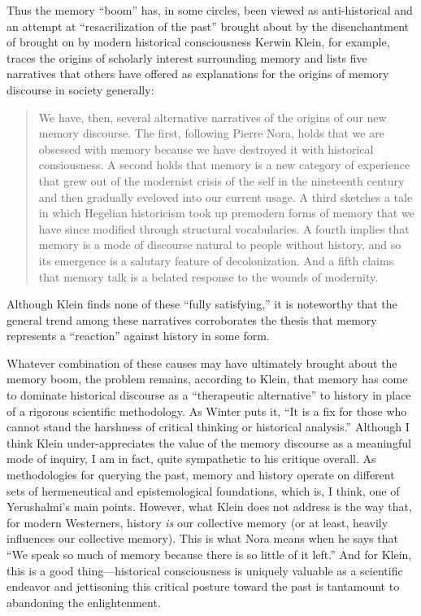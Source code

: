 Thus the memory ``boom'' has, in some circles, been viewed as
anti-historical and an attempt at ``resacrilization of the past''
brought about by the disenchantment of brought on by modern historical
consciousness\autocite[282]{winter2006} Kerwin Klein, for example,
traces the origins of scholarly interest surrounding memory and lists
five narratives that others have offered as explanations for the origins
of memory discourse in society generally:

\begin{quote}
We have, then, several alternative narratives of the origins of our new
memory discourse. The first, following Pierre Nora, holds that we are
obsessed with memory because we have destroyed it with historical
consiousness. A second holds that memory is a new category of experience
that grew out of the modernist crisis of the self in the nineteenth
century and then gradually eveloved into our current usage. A third
sketches a tale in which Hegelian historicism took up premodern forms of
memory that we have since modified through structural vocabularies. A
fourth implies that memory is a mode of discourse natural to people
without history, and so its emergence is a salutary feature of
decolonization. And a fifth claims that memory talk is a belated
response to the wounds of modernity.\autocite[134]{klein_klein2011}
\end{quote}

Although Klein finds none of these ``fully satisfying,'' it is
noteworthy that the general trend among these narratives corroborates
the thesis that memory represents a ``reaction'' against history in some
form.

Whatever combination of these causes may have ultimately brought about
the memory boom, the problem remains, according to Klein, that memory
has come to dominate historical discourse as a ``therapeutic
alternative'' to history in place of a rigorous scientific
methodology.\autocite[137]{klein2011} As Winter puts it, ``It is a fix
for those who cannot stand the harshness of critical thinking or
historical analysis.''\autocite[283 (summarizing Klein)]{winter2006}
Although I think Klein under-appreciates the value of the memory
discourse as a meaningful mode of inquiry, I am in fact, quite
sympathetic to his critique overall. As methodologies for querying the
past, memory and history operate on different sets of hermeneutical and
epistemological foundations, which is, I think, one of Yerushalmi's main
points. However, what Klein does not address is the way that, for modern
Westerners, history \emph{is} our collective memory (or at least,
heavily influences our collective memory). This is what Nora means when
he says that ``We speak so much of memory because there is so little of
it left.''\autocite[7]{nora_representations1989} And for Klein, this is
a good thing---historical consciousness is uniquely valuable as a
scientific endeavor and jettisoning this critical posture toward the
past is tantamount to abandoning the enlightenment.

